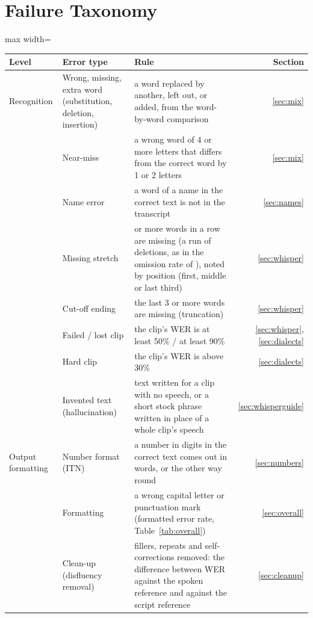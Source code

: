 \documentclass[11pt]{article}
\begin{document}
\FloatBarrier
\section{Failure Taxonomy}\label{sec:taxonomy}
\begin{table}[!htbp]
\centering\small
\begin{adjustbox}{max width=\textwidth}
\begin{tabular}{@{}>{\raggedright\arraybackslash}p{2.4cm}>{\raggedright\arraybackslash}p{3.6cm}>{\raggedright\arraybackslash}p{8.2cm}r@{}}
\toprule
Level & Error type & Rule & Section \\
\midrule
Recognition & Wrong, missing, extra word (substitution, deletion, insertion) & a word replaced by another, left out, or added, from the word-by-word comparison & \ref{sec:mix} \\
& Near-miss & a wrong word of 4 or more letters that differs from the correct word by 1 or 2 letters & \ref{sec:mix} \\
& Name error & a word of a name in the correct text is not in the transcript & \ref{sec:names} \\
& Missing stretch & 5 or more words in a row are missing (a run of deletions, as in the omission rate of \citealp{ramirez2024anatomy}), noted by position (first, middle or last third) & \ref{sec:whisper} \\
& Cut-off ending & the last 3 or more words are missing (truncation) & \ref{sec:whisper} \\
& Failed / lost clip & the clip's WER is at least 50\% / at least 90\% & \ref{sec:whisper}, \ref{sec:dialects} \\
& Hard clip & the clip's WER is above 30\% & \ref{sec:dialects} \\
& Invented text (hallucination) & text written for a clip with no speech, or a short stock phrase written in place of a whole clip's speech & \ref{sec:whisperguide} \\
\addlinespace
Output formatting & Number format (ITN) & a number in digits in the correct text comes out in words, or the other way round & \ref{sec:numbers} \\
& Formatting & a wrong capital letter or punctuation mark (formatted error rate, Table~\ref{tab:overall}) & \ref{sec:overall} \\
& Clean-up (disfluency removal) & fillers, repeats and self-corrections removed: the difference between WER against the spoken reference and against the script reference & \ref{sec:cleanup} \\

\end{tabular}
\end{adjustbox}
\end{table}
\end{document}
